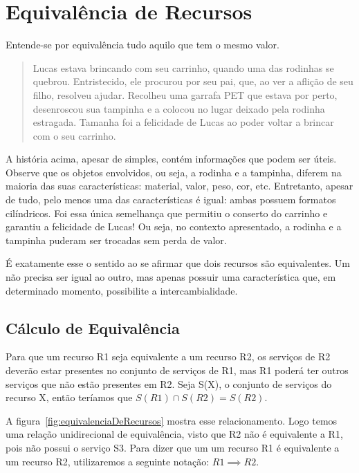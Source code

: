 \section{Equivalência de Recursos}

Entende-se por equivalência tudo aquilo que tem o mesmo valor.

\begin{quote}
	Lucas estava brincando com seu carrinho, quando uma das rodinhas se quebrou. Entristecido, ele procurou por seu pai, que, ao ver a aflição de seu filho, resolveu ajudar. Recolheu uma garrafa PET que estava por perto, desenroscou sua tampinha e a colocou no lugar deixado pela rodinha estragada. Tamanha foi a felicidade de Lucas ao poder voltar a brincar com o seu carrinho.
\end{quote}

A história acima, apesar de simples, contém informações que podem ser úteis. Observe que os objetos envolvidos, ou seja, a rodinha e a tampinha, diferem na maioria das suas características: material, valor, peso, cor, etc. Entretanto, apesar de tudo, pelo menos uma das características é igual: ambas possuem formatos cilíndricos. Foi essa única semelhança que permitiu o conserto do carrinho e garantiu a felicidade de Lucas! Ou seja, no contexto apresentado, a rodinha e a tampinha puderam ser trocadas sem perda de valor.

É exatamente esse o sentido ao se afirmar que dois recursos são equivalentes. Um não precisa ser igual ao outro, mas apenas possuir uma característica que, em determinado momento, possibilite a intercambialidade.

\subsection{Cálculo de Equivalência}

Para que um recurso R1 seja equivalente a um recurso R2, os serviços de R2 deverão estar presentes no conjunto de serviços de R1, mas R1 poderá ter outros serviços que não estão presentes em R2. Seja S(X), o conjunto de serviços do recurso X, então teríamos que $S(R1) \cap S(R2) = S(R2)$. 
	
A figura~\ref{fig:equivalenciaDeRecursos} mostra esse relacionamento.
Logo temos uma relação unidirecional de equivalência, visto que R2 não é equivalente a R1, pois não possui o serviço S3. Para dizer que um um recurso R1 é equivalente a um recurso R2, utilizaremos a seguinte notação: $R1 \implies R2$.
	
